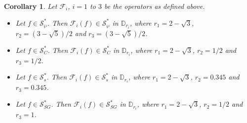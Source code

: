 \documentclass[12pt, reqno]{amsart}
\numberwithin{equation}{section}
\theoremstyle{plain}
\newtheorem{corollary}[theorem]{Corollary}
\theoremstyle{definition}
\theoremstyle{remark}
\begin{document}
\begin{corollary} 
	Let $\mathcal{F}_i$, $i=1$ to $3$ be the operators as defined above.
	\begin{itemize}
		\item [$(i)$] Let $f\in \mathcal{S}^*_{\wp}$. Then $\mathcal{F}_i(f) \in \mathcal{S}^*_{\wp}$ in $\mathbb{D}_{r_i}$, where
		$r_1=2-\sqrt{3}$, $r_2=(3-\sqrt{5})/2$ and $r_3=(3-\sqrt{5})/2$.
		\item [$(ii)$] Let $f\in  \mathcal{S}^*_{C}$. Then $\mathcal{F}_i(f) \in \mathcal{S}^*_{C}$ in $\mathbb{D}_{r_i}$, where
		$r_1=2-\sqrt{3}$, $r_2=1/2$ and $r_3=1/2$. 
		\item [$(iii)$] Let $f\in \mathcal{S}^*_{s}$. Then $\mathcal{F}_i(f) \in \mathcal{S}^*_{s}$ in $\mathbb{D}_{r_i}$, where
		$r_1=2-\sqrt{3}$, $r_2=0.345$ and $r_3=0.345$.
		\item [$(iv)$] Let $f \in \mathcal{S}^*_{SG}$. Then $\mathcal{F}_i(f) \in \mathcal{S}^*_{SG}$ in $\mathbb{D}_{r_i}$, where
		$r_1=2-\sqrt{3}$, $r_2=1/2$ and $r_3=1$. 
	\end{itemize}
\end{corollary}
\end{document}
